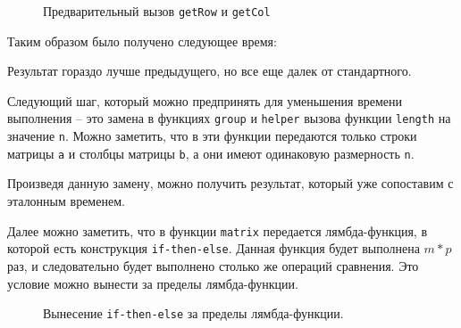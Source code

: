 \documentclass[a4paper,12pt,russian]{article}
\begin{document}
	\begin{figure}[H]
		\caption{Предварительный вызов \texttt{getRow} и \texttt{getCol}}
		
	\end{figure}
	
	Таким образом было получено следующее время:
	
	
	Результат гораздо лучше предыдущего, но все еще далек от стандартного.
	
	Следующий шаг, который можно предпринять для уменьшения времени выполнения -- это замена в функциях \texttt{group} и \texttt{helper} вызова функции \texttt{length} на значение \texttt{n}. Можно заметить, что в эти функции передаются только строки матрицы \texttt{a} и столбцы матрицы \texttt{b}, а они имеют одинаковую размерность \texttt{n}. 
	
	Произведя данную замену, можно получить результат, который уже сопоставим с эталонным временем.
	
	
	Далее можно заметить, что в функции \texttt{matrix} передается лямбда-функция, в которой есть конструкция \texttt{if-then-else}. Данная функция будет выполнена \(m*p\) раз, и следовательно будет выполнено столько же операций сравнения. Это условие можно вынести за пределы лямбда-функции.
	
	\begin{figure}[H]
		\caption{Вынесение \texttt{if-then-else} за пределы лямбда-функции.}
		
	\end{figure}
	
\end{document}
